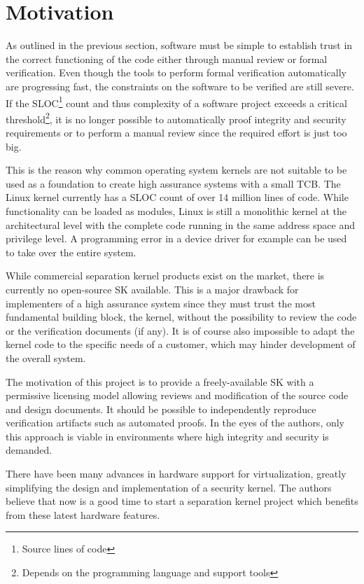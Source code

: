 \section{Motivation}
As outlined in the previous section, software must be simple to establish trust
in the correct functioning of the code either through manual review or formal
verification. Even though the tools to perform formal verification
automatically are progressing fast, the constraints on the software to be
verified are still severe. If the SLOC\footnote{Source lines of
code} count and thus complexity of a software project exceeds a
critical threshold\footnote{Depends on the programming language and support
tools}, it is no longer possible to automatically proof integrity and security
requirements or to perform a manual review since the required effort is just
too big.

This is the reason why common operating system kernels are not suitable to be
used as a foundation to create high assurance systems with a small TCB. The
Linux kernel currently has a SLOC count of over 14 million lines
of code. While functionality can be loaded as modules, Linux is still a
monolithic kernel at the architectural level with the complete code running in
the same address space and privilege level. A programming error in a device
driver for example can be used to take over the entire system.

While commercial separation kernel products exist on the market, there is
currently no open-source SK available. This is a major drawback for
implementers of a high assurance system since they must trust the most
fundamental building block, the kernel, without the possibility to review the
code or the verification documents (if any). It is of course also impossible to
adapt the kernel code to the specific needs of a customer, which may hinder
development of the overall system.

The motivation of this project is to provide a freely-available SK with a
permissive licensing model allowing reviews and modification of
the source code and design documents. It should be possible to independently
reproduce verification artifacts such as automated proofs. In the eyes of the
authors, only this approach is viable in environments where high integrity and
security is demanded.

There have been many advances in hardware support for virtualization, greatly
simplifying the design and implementation of a security kernel. The authors
believe that now is a good time to start a separation kernel project which
benefits from these latest hardware features.

